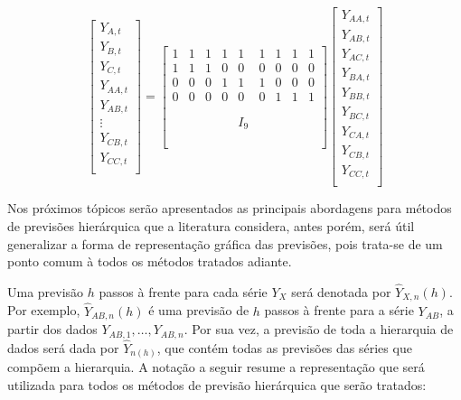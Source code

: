 \documentclass[
	12pt,				%
	openright,			%
	twoside,			%
	a4paper,			%
	english,			%
	french,				%
	spanish,			%
	brazil				%
	]{abntex2}
\begin{document}
\[\begin{bmatrix}
Y_{A,t}\\[0.3em]
Y_{B,t}\\[0.3em]
Y_{C,t}\\[0.3em]
Y_{AA,t}\\[0.3em]
Y_{AB,t}\\[0.3em]
\vdots\\[0.3em]
Y_{CB,t}\\[0.3em]
Y_{CC,t}\\[0.3em]
\end{bmatrix}
 = \begin{bmatrix}
1 & 1 & 1 & 1 & 1 & 1 & 1 & 1 & 1 \\[0.3em]
1 & 1 & 1 & 0 & 0 & 0 & 0 & 0 & 0 \\[0.3em]
0 & 0 & 0 & 1 & 1 & 1 & 0 & 0 & 0 \\[0.3em]
0 & 0 & 0 & 0 & 0 & 0 & 1 & 1 & 1 \\[0.3em]
    &   &   &   &   &   &   &   &   \\[0.3em]
    &   &   &   &   &   &   &   &   \\[0.3em]
    &   &   &   & I_9  &   &   &   &   \\[0.3em]
    &   &   &   &   &   &   &   &   \\[0.3em]
    &   &   &   &   &   &   &   &   \\[0.3em]
\end{bmatrix}  \begin{bmatrix}
Y_{AA,t}\\[0.3em]
Y_{AB,t}\\[0.3em]
Y_{AC,t}\\[0.3em]
Y_{BA,t}\\[0.3em]
Y_{BB,t}\\[0.3em]
Y_{BC,t}\\[0.3em]
Y_{CA,t}\\[0.3em]
Y_{CB,t}\\[0.3em]
Y_{CC,t}\\[0.3em]
\end{bmatrix}\]

Nos próximos tópicos serão apresentados as principais abordagens para métodos de previsões hierárquica que a literatura considera, antes porém, será útil generalizar a forma de representação gráfica das previsões, pois trata-se de um ponto comum à todos os métodos tratados adiante.


Uma previsão $h$ passos à frente para cada série $Y_X$ será denotada por $\hat{Y}_{X,n}(h)$. Por exemplo, $\hat{Y}_{AB,n}(h)$ é uma previsão de $h$ passos à frente para a série $Y_{AB}$, a partir dos dados $Y_{AB, 1}, \dots,Y_{AB, n}$. Por sua vez, a previsão de toda a hierarquia de dados será dada por $\hat{Y}_{n(h)}$, que contém todas as previsões das séries que compõem a hierarquia.
A notação a seguir resume a representação que será utilizada para todos os métodos de previsão hierárquica que serão tratados:
\end{document}

